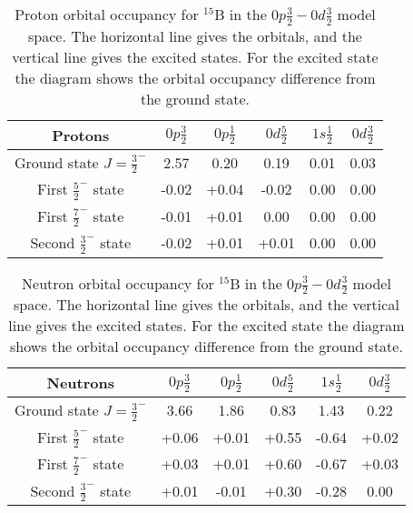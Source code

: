 \begin{table}
\begin{center}
\begin{tabular}{|c|c|c|c|c|c|}
	\hline
	Protons & $0p\frac32$ & $0p\frac12$ & $0d\frac52$ & $1s\frac12$ & $0d\frac32$ \\
	\hline
	Ground state $J=\frac32^-$ & 2.57 & 0.20 & 0.19 & 0.01 & 0.03 \\
	\hline
	First $\frac52^-$ state & -0.02 & +0.04 & -0.02 & 0.00 & 0.00 \\
	\hline
	First $\frac72^-$ state & -0.01 & +0.01 & 0.00 & 0.00 & 0.00 \\
	\hline
	Second $\frac32^-$ state & -0.02 & +0.01 & +0.01 & 0.00 & 0.00 \\
	\hline
\end{tabular}
\caption{Proton orbital occupancy for $^{15}$B in the $0p\frac32-0d\frac32$ model space. The horizontal line gives the orbitals, and the vertical line gives the excited states. For the excited state the diagram shows the orbital occupancy difference from the ground state.}
\label{B15_0d3_p}
\end{center}
\end{table}

\begin{table}
\begin{center}
\begin{tabular}{|c|c|c|c|c|c|}
	\hline
	Neutrons & $0p\frac32$ & $0p\frac12$ & $0d\frac52$ & $1s\frac12$ & $0d\frac32$  \\
	\hline
	Ground state $J=\frac32^-$ & 3.66 & 1.86 & 0.83 & 1.43 & 0.22 \\
	\hline
	First $\frac52^-$ state & +0.06 & +0.01 & +0.55 & -0.64 & +0.02 \\
	\hline
	First $\frac72^-$ state & +0.03 & +0.01 & +0.60 & -0.67 & +0.03 \\
	\hline
	Second $\frac32^-$ state & +0.01 & -0.01 & +0.30 & -0.28 & 0.00 \\
	\hline
\end{tabular}
\caption{Neutron orbital occupancy for $^{15}$B in the $0p\frac32-0d\frac32$ model space. The horizontal line gives the orbitals, and the vertical line gives the excited states. For the excited state the diagram shows the orbital occupancy difference from the ground state.}
\label{B15_0d3_n}
\end{center}
\end{table}

